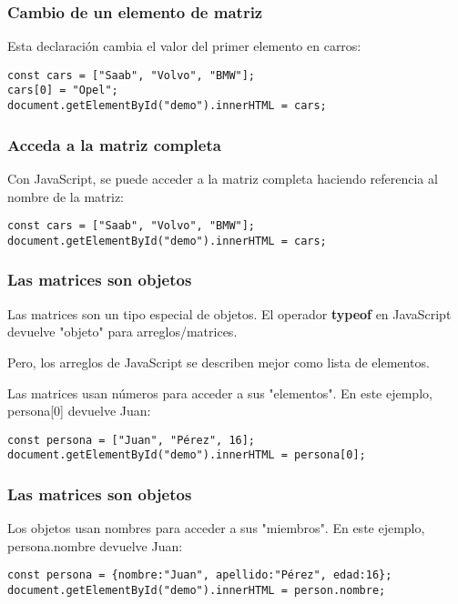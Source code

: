 \begin{frame}[fragile]
  \frametitle{Cambio de un elemento de matriz}

  Esta declaración cambia el valor del primer elemento en carros:

  \vspace{\baselineskip}
  \begin{lstlisting}
const cars = ["Saab", "Volvo", "BMW"];
cars[0] = "Opel";
document.getElementById("demo").innerHTML = cars;
  \end{lstlisting}
\end{frame}

\begin{frame}[fragile]
  \frametitle{Acceda a la matriz completa}

  Con JavaScript, se puede acceder a la matriz completa
  haciendo referencia al nombre de la matriz:

  \vspace{\baselineskip}
  \begin{lstlisting}
const cars = ["Saab", "Volvo", "BMW"];
document.getElementById("demo").innerHTML = cars;
  \end{lstlisting}
\end{frame}

\begin{frame}[fragile]
  \frametitle{Las matrices son objetos}

  Las matrices son un tipo especial de objetos.
  El operador \textbf{typeof} en JavaScript devuelve "objeto" para
  arreglos/matrices.

  \vspace{\baselineskip}
  Pero, los arreglos de JavaScript se describen mejor como lista de
  elementos.

  \vspace{\baselineskip}
  Las matrices usan números para acceder a sus "elementos".
  En este ejemplo, persona[0] devuelve Juan:

  \vspace{\baselineskip}
  \begin{lstlisting}
const persona = ["Juan", "Pérez", 16];
document.getElementById("demo").innerHTML = persona[0];
  \end{lstlisting}
\end{frame}

\begin{frame}[fragile]
  \frametitle{Las matrices son objetos}

  Los objetos usan nombres para acceder a sus "miembros".
  En este ejemplo, persona.nombre devuelve Juan:

  \vspace{\baselineskip}
  \begin{lstlisting}
const persona = {nombre:"Juan", apellido:"Pérez", edad:16};
document.getElementById("demo").innerHTML = person.nombre;
  \end{lstlisting}
\end{frame}

